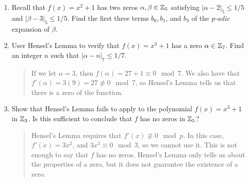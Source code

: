 \documentclass{hw}
\begin{document}

\begin{enumerate}
    \item Recall that $f(x)=x^2 + 1$ has two zeros $\alpha,\beta\in\mathbb{Z}_{5}$ satisfying $|\alpha-2|_{5}\leq 1/5$ and
    $|\beta-3|_{5}\leq 1/5$. Find the first three terms $b_{0}, b_{1}$, and $b_{3}$ of the \textit{p-adic} expansion
    of $\beta$.

    \item User Hensel's Lemma to verify that $f(x)=x^3+1$ has a zero $\alpha\in\mathbb{Z}_{7}$. Find an integer $n$ such that
    $|\alpha-n|_{7} \leq 1/7$.
    \begin{quote}
        If we let $\alpha=3$, then $f(\alpha)=27+1\equiv 0\mod 7$. We also have that
        $f'(\alpha)=3(9)=27\not\equiv0\mod7$, so Hensel's Lemma tells us that there is a zero of the function. 
    \end{quote}

    \item Show that Hensel's Lemma fails to apply to the polynomial $f(x)=x^3+1$ in $\mathbb{Z}_{3}$. Is this sufficient to
    conclude that $f$ has no zeros in $\mathbb{Z}_{5}$?
    \begin{quote}
        Hensel's Lemma requires that $f'(x)\not\equiv 0 \mod p$. In this case, $f'(x)=3x^{2}$, and
        $3x^{2}\equiv0\mod 3$, so we cannot use it. This is not enough to say that $f$ has no zeros. Hensel's Lemma only tells us about the properties of a zero, but it does not guarantee the existence of a zero.
    \end{quote}
\end{enumerate}
\end{document}
